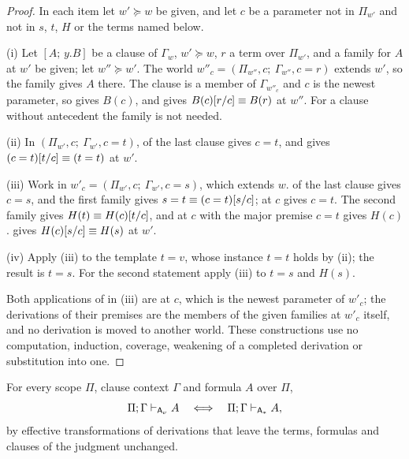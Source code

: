 \begin{proof}
In each item let $w'\succeq w$ be given, and let $c$ be a parameter not in
$\Pi_{w'}$ and not in $s$, $t$, $H$ or the terms named below.

(i) Let $[A;\,y.B]$ be a clause of $\Gamma_w$, $w'\succeq w$, $r$ a term
over $\Pi_{w'}$, and a family for $A$ at $w'$ be given; let $w''\succeq w'$.
The world $w''_c=(\Pi_{w''},c;\ \Gamma_{w''},c=r)$ extends $w'$, so the
family gives $A$ there.  The clause is a member of $\Gamma_{w''_c}$ and $c$
is the newest parameter, so  gives $B(c)$, and
 gives $B(c)[r/c]\equiv B(r)$ at $w''$.  For a clause
without antecedent the family is not needed.

(ii) In $(\Pi_{w'},c;\ \Gamma_{w'},c=t)$,  of the last clause
gives $c=t$, and  gives $(c=t)[t/c]\equiv(t=t)$ at
$w'$.

(iii) Work in $w'_c=(\Pi_{w'},c;\ \Gamma_{w'},c=s)$, which extends $w$.
 of the last clause gives $c=s$, and the first family gives
$s=t\equiv(c=t)[s/c]$;  at $c$ gives $c=t$.  The
second family gives $H(t)\equiv H(c)[t/c]$, and  at $c$
with the major premise $c=t$ gives $H(c)$.   gives
$H(c)[s/c]\equiv H(s)$ at $w'$.

(iv) Apply (iii) to the template $t=v$, whose instance $t=t$ holds by
(ii); the result is $t=s$.  For the second statement apply (iii) to $t=s$
and $H(s)$.

Both applications of  in (iii) are at $c$, which is the
newest parameter of $w'_c$; the derivations of their premises are the
members of the given families at $w'_c$ itself, and no derivation is moved
to another world.  These constructions use no computation, induction,
coverage, weakening of a completed derivation or substitution into one.
\end{proof}

\begin{theorem}
\label{wit:thm:ab-newest}
For every scope $\Pi$, clause context $\Gamma$ and formula $A$ over $\Pi$,
\[
 \Pi;\Gamma\vdash_{\mathsf{A}_{\nu}}A
 \quad\Longleftrightarrow\quad
 \Pi;\Gamma\vdash_{\mathsf{A}_{\ast}}A ,
\]
by effective transformations of derivations that leave the terms, formulas
and clauses of the judgment unchanged.
\end{theorem}

